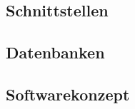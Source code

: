 

    
    \subsection{Schnittstellen}
    
    \subsection{Datenbanken}

\subsection{Softwarekonzept}
\label{subsec:softwarekonzept}




